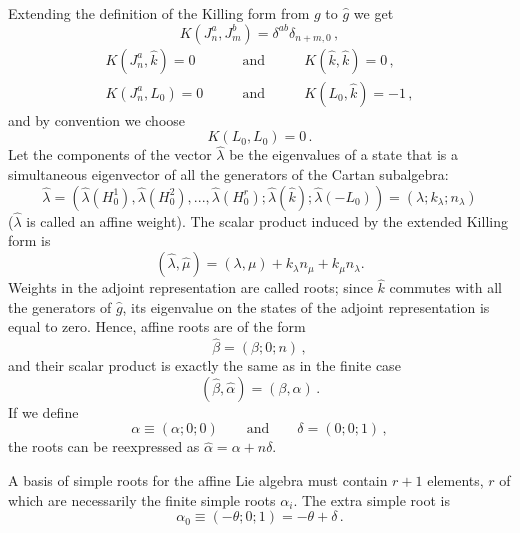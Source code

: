 \documentclass[a4paper,12pt]{report}
\begin{document}
Extending the definition of the Killing form from $g$ to $\hat{g}$ we get
\begin{equation}
K\left(J_{n}^{a},J_{m}^{b}\right)=\delta^{ab}\delta_{n+m,0}\,,
\end{equation}
\begin{eqnarray}
K\left(J_{n}^{a},\hat{k}\right)=0\qquad &\textrm{and}& \qquad K\left(\hat{k},\hat{k}\right)=0\,,\\
K\left(J_{n}^{a},L_{0}\right)=0\qquad &\textrm{and}& \qquad K\left(L_{0},\hat{k}\right)=-1\,,
\end{eqnarray}
and by convention we choose
\begin{equation}
K\left(L_{0},L_{0}\right)=0\,.
\end{equation}
Let the components of the vector $\hat{\lambda}$ be the eigenvalues of a state that is a simultaneous eigenvector
of all the generators of the Cartan subalgebra:
\begin{equation}
\hat{\lambda}=\left(\hat{\lambda}(H_{0}^{1}),\hat{\lambda}(H_{0}^{2}),...,\hat{\lambda}(H_{0}^{r});\hat{\lambda}(\hat{k});\hat{\lambda}(-L_{0})\right)=(\lambda;k_{\lambda};n_{\lambda})
\end{equation}
($\hat{\lambda}$ is called an affine weight). The scalar product induced by the extended Killing form is
\begin{equation}
(\hat{\lambda},\hat{\mu})=(\lambda,\mu)+k_{\lambda}n_{\mu}+k_{\mu}n_{\lambda}.
\end{equation}
Weights in the adjoint representation are called roots; since $\hat{k}$ commutes with all the generators of
$\hat{g}$, its eigenvalue on the states of the adjoint representation is equal to zero. Hence, affine roots are
of the form
\begin{equation}
\hat{\beta}=(\beta;0;n)\,,
\end{equation}
and their scalar product is exactly the same as in the finite case
\begin{equation}
(\hat{\beta},\hat{\alpha})=(\beta,\alpha)\,.
\end{equation}
If we define
\begin{equation}
\alpha\equiv(\alpha;0;0)\qquad \textrm{and} \qquad \delta=(0;0;1)\,,
\end{equation}
the roots can be reexpressed as $\hat{\alpha}=\alpha+n\delta$.

A basis of simple roots for the affine Lie algebra must contain $r+1$ elements, $r$ of which are necessarily the
finite simple roots $\alpha_{i}$. The extra simple root is
\begin{equation}
\alpha_{0}\equiv (-\theta;0;1)=-\theta+\delta\,.
\end{equation}
\end{document}
